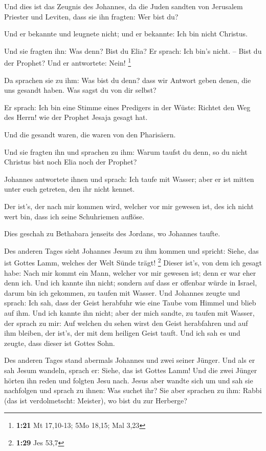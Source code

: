  Und dies ist das Zeugnis des Johannes, da die Juden
sandten von Jerusalem Priester und Leviten, dass sie ihn fragten: Wer
bist du?

 Und er bekannte und leugnete nicht; und er bekannte: Ich
bin nicht Christus.

 Und sie fragten ihn: Was denn? Bist du Elia? Er sprach:
Ich bin's nicht. -- Bist du der Prophet? Und er antwortete: Nein!
\footnote{\textbf{1:21} Mt 17,10-13; 5Mo 18,15; Mal 3,23}

 Da sprachen sie zu ihm: Was bist du denn? dass wir
Antwort geben denen, die uns gesandt haben. Was sagst du von dir selbst?

 Er sprach: Ich bin eine Stimme eines Predigers in der
Wüste: Richtet den Weg des Herrn! wie der Prophet Jesaja gesagt hat.

 Und die gesandt waren, die waren von den Pharisäern.

 Und sie fragten ihn und sprachen zu ihm: Warum taufst du
denn, so du nicht Christus bist noch Elia noch der Prophet?

 Johannes antwortete ihnen und sprach: Ich taufe mit
Wasser; aber er ist mitten unter euch getreten, den ihr nicht kennet.

 Der ist's, der nach mir kommen wird, welcher vor mir
gewesen ist, des ich nicht wert bin, dass ich seine Schuhriemen auflöse.

 Dies geschah zu Bethabara jenseits des Jordans, wo
Johannes taufte.

 Des anderen Tages sieht Johannes Jesum zu ihm kommen und
spricht: Siehe, das ist Gottes Lamm, welches der Welt Sünde trägt!
\footnote{\textbf{1:29} Jes 53,7}  Dieser ist's, von dem
ich gesagt habe: Nach mir kommt ein Mann, welcher vor mir gewesen ist;
denn er war eher denn ich.  Und ich kannte ihn nicht;
sondern auf dass er offenbar würde in Israel, darum bin ich gekommen, zu
taufen mit Wasser.  Und Johannes zeugte und sprach: Ich
sah, dass der Geist herabfuhr wie eine Taube vom Himmel und blieb auf
ihm.  Und ich kannte ihn nicht; aber der mich sandte, zu
taufen mit Wasser, der sprach zu mir: Auf welchen du sehen wirst den
Geist herabfahren und auf ihm bleiben, der ist's, der mit dem heiligen
Geist tauft.  Und ich sah es und zeugte, dass dieser ist
Gottes Sohn.

 Des anderen Tages stand abermals Johannes und zwei
seiner Jünger.  Und als er sah Jesum wandeln, sprach er:
Siehe, das ist Gottes Lamm!  Und die zwei Jünger hörten
ihn reden und folgten Jesu nach.  Jesus aber wandte sich
um und sah sie nachfolgen und sprach zu ihnen: Was suchet ihr? Sie aber
sprachen zu ihm: Rabbi (das ist verdolmetscht: Meister), wo bist du zur
Herberge?

